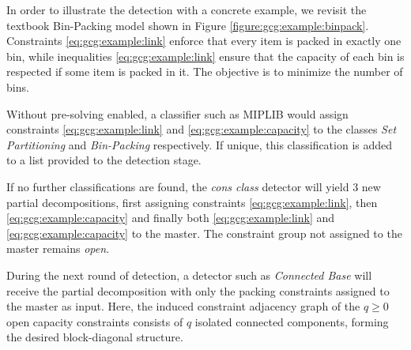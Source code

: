 		In order to illustrate the detection with a concrete example, we revisit the textbook Bin-Packing model shown in Figure \ref{figure:gcg:example:binpack}.
		Constraints \ref{eq:gcg:example:link} enforce that every item is packed in exactly one bin, while inequalities \ref{eq:gcg:example:link} ensure that the capacity of each bin is respected if some item is packed in it.
		The objective is to minimize the number of bins.
		
		Without pre-solving enabled, a classifier such as MIPLIB would assign constraints \ref{eq:gcg:example:link} and \ref{eq:gcg:example:capacity} to the classes \textit{Set Partitioning} and \textit{Bin-Packing} respectively.
		If unique, this classification is added to a list provided to the detection stage.
		
		If no further classifications are found, the \textit{cons class} detector will yield 3 new partial decompositions, first assigning constraints \ref{eq:gcg:example:link}, then \ref{eq:gcg:example:capacity} and finally both \ref{eq:gcg:example:link} and \ref{eq:gcg:example:capacity} to the master.
		The constraint group not assigned to the master remains \textit{open}.
		
		During the next round of detection, a detector such as \textit{Connected Base} will receive the partial decomposition with only the packing constraints assigned to the master as input.
		Here, the induced constraint adjacency graph of the $q \ge 0$ open capacity constraints consists of $q$ isolated connected components, forming the desired block-diagonal structure.
		
		